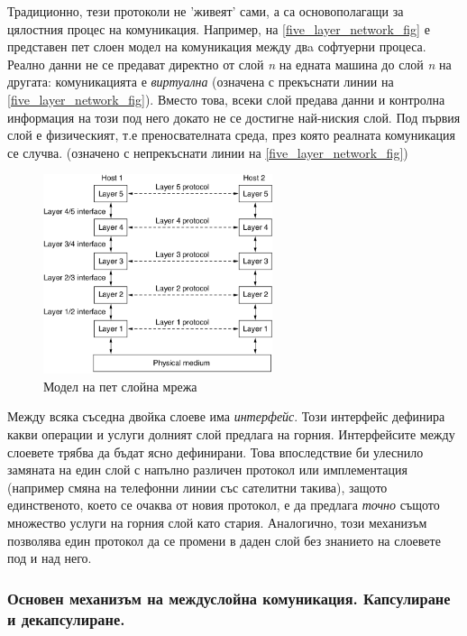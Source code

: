 \documentclass[12pt,a4paper,oneside]{book}
\begin{document}
Традиционно, тези протоколи не 'живеят' сами, а са основополагащи за цялостния
процес на комуникация.  Например, на \autoref{five_layer_network_fig} е
представен пет слоен модел на комуникация между двa софтуерни процеса. Реално
данни не се предават директно от слой \textit{n} на едната машина до слой
\textit{n} на другата: комуникацията е \textit{виртуална} (означена с прекъснати
линии на \autoref{five_layer_network_fig}).
Вместо това, всеки слой предава данни и контролна информация на този под него
докато не се достигне най-ниския слой. Под първия слой е физическият, т.е
преносвателната среда, през която реалната комуникация се случва. (означено с
непрекъснати линии на \autoref{five_layer_network_fig})

\begin{figure}[h!]
  \centering
  \includegraphics[width=0.6\textwidth]{figures/five_layer_network.png}
  \caption{Модел на пет слойна мрежа}
  \label{five_layer_network_fig}
\end{figure}

Между всяка съседна двойка слоеве има \textit{интерфейс}. Този интерфейс
дефинира какви операции и услуги долният слой предлага на горния. Интерфейсите
между слоевете трябва да бъдат ясно дефинирани. Това впоследствие би улеснило
замяната на един слой с напълно различен протокол или имплементация (например
смяна на телефонни линии със сателитни такива), защото единственото, което се
очаква от новия протокол, е да предлага \textit{точно} същото множество услуги
на горния слой като стария. Аналогично, този механизъм позволява един протокол
да се промени в даден слой без знанието на слоевете под и над него.

\subsubsection{Основен механизъм на междуслойна комуникация. Капсулиране и
декапсулиране.}
\end{document}

